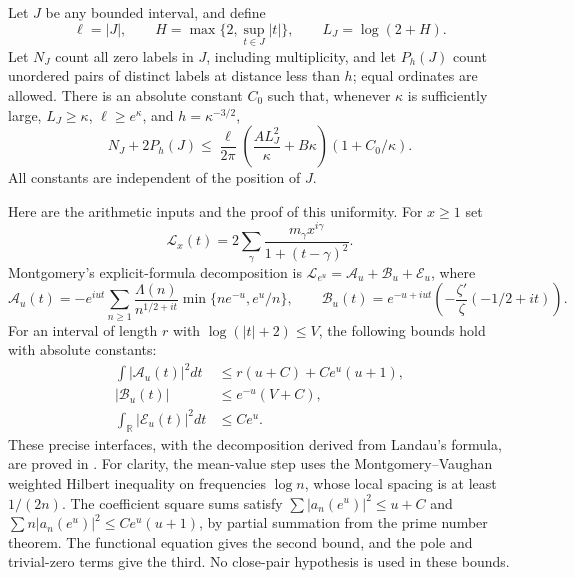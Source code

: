 Let \(J\) be any bounded interval, and define
\[
 \ell=|J|,\qquad H=\max\{2,\sup_{t\in J}|t|\},
 \qquad L_J=\log(2+H).
\]
Let \(N_J\) count all zero labels in \(J\), including multiplicity,
and let \(P_h(J)\) count unordered pairs of distinct labels at distance
less than \(h\); equal ordinates are allowed. There is an absolute
constant \(C_0\) such that, whenever
\(\kappa\) is sufficiently large,
\(L_J\ge\kappa\), \(\ell\ge e^\kappa\), and
\(h=\kappa^{-3/2}\),
\begin{equation}\label{eq:cosine-uniform-pair}
 N_J+2P_h(J)
 \le\frac{\ell}{2\pi}
       \left(\frac{A L_J^2}{\kappa}+B\kappa\right)
          (1+C_0/\kappa).
\end{equation}
All constants are independent of the position of \(J\).

Here are the arithmetic inputs and the proof of this uniformity.
For \(x\ge1\) set
\[
 \mathcal L_x(t)=2\sum_\gamma
           \frac{m_\gamma x^{i\gamma}}{1+(t-\gamma)^2}.
\]
Montgomery's explicit-formula decomposition is
\(\mathcal L_{e^u}=\mathcal A_u+\mathcal B_u+\mathcal E_u\),
where
\[
 \mathcal A_u(t)=-e^{iut}\sum_{n\ge1}
       \frac{\Lambda(n)}{n^{1/2+it}}
                  \min\{ne^{-u},e^u/n\},
 \qquad
 \mathcal B_u(t)=e^{-u+iut}
           \left(-\frac{\zeta'}\zeta(-1/2+it)\right).
\]
For an interval of length \(r\) with
\(\log(|t|+2)\le V\), the following bounds hold with absolute
constants:
\begin{equation}\label{eq:cosine-Montgomery-input}
 \begin{split}
 \int|\mathcal A_u(t)|^2dt
    &\le r(u+C)+Ce^u(u+1),\\
 |\mathcal B_u(t)|&\le e^{-u}(V+C),\\
 \int_{\mathbb R}|\mathcal E_u(t)|^2dt&\le Ce^u.
 \end{split}
\end{equation}
These precise interfaces, with the decomposition derived from
Landau's formula, are proved in
\cite[Lemmas~3.3--3.5, pp.~6--7]{mori-rh-alone2026}.
For clarity, the mean-value step uses the Montgomery--Vaughan
weighted Hilbert inequality on frequencies \(\log n\), whose local
spacing is at least \(1/(2n)\). The coefficient square sums satisfy
\(\sum|a_n(e^u)|^2\le u+C\) and
\(\sum n|a_n(e^u)|^2\le Ce^u(u+1)\), by partial summation
from the prime number theorem. The functional equation gives the
second bound, and the pole and trivial-zero terms give the third.
No close-pair hypothesis is used in these bounds.

